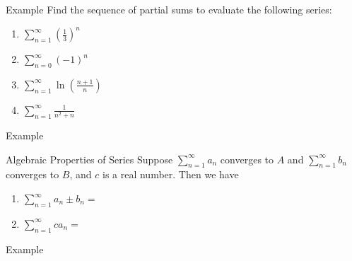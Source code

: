 \documentclass[presentation]{beamer}
\begin{document}
\begin{frame}[label={sec:org8b6fc5a}]{Example}
Find the sequence of partial sums to evaluate the following series:
\begin{enumerate}
\item \(\sum\limits_{n=1}^{\infty} \left( \frac{1}{3} \right)^n\)
\item \(\sum\limits_{n=0}^{\infty} \left( -1 \right)^n\)
\item \(\sum\limits_{n=1}^{\infty} \ln \left( \frac{n+1}{n} \right)\)
\item \(\sum\limits_{n=1}^{\infty} \frac{1}{n^2+n}\)
\end{enumerate}
\vspace{10in}
\end{frame}

\begin{frame}[label={sec:org740c6ff}]{Example}
\end{frame}

\begin{frame}[label={sec:orgbf5acec}]{Algebraic Properties of Series}
Suppose \(\sum\limits_{n=1}^{\infty} a_n\) converges to \(A\) and
\(\sum\limits_{n=1}^{\infty} b_n\) converges to \(B\), and \(c\) is a
real number.  Then we have
\begin{enumerate}
\item \(\sum\limits_{n=1}^{\infty} a_n \pm b_n =\)
\item \(\sum\limits_{n=1}^{\infty} c a_n =\)
\end{enumerate}
\vspace{10in}   
\end{frame}

\begin{frame}[label={sec:orgaa4dfb4}]{Example}
\end{frame}
\end{document}
